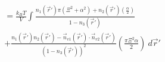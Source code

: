 \documentclass[double,12pt]{beavtex}
\begin{document}
\begin{align}
%
           &= \frac{k_BT}{V}\int  \frac{n_1(\vec r')
           \pi(\Xi^2 + \alpha^2)
          +n_2(\vec r')\left(\frac{\alpha}{2}\right)}{1-n_3(\vec r')} 
          \nonumber \\
          &+ \frac{n_1(\vec r')n_2(\vec r')
          -\vec n_{v1}(\vec r')
          \cdot \vec n_{v2}(\vec r')}{(1-n_3(\vec r'))^2}
          \left(\frac{\pi\Xi^2\alpha}{2}\right)   ~d\vec r'
\end{align}
\end{document}
